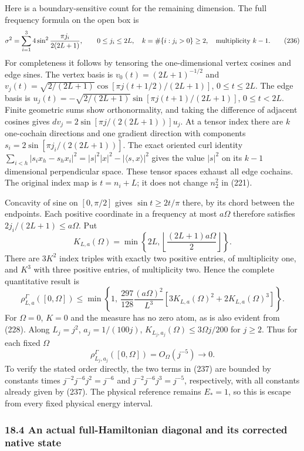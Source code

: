 \documentclass[
  11pt,
]{article}
\begin{document}
Here is a boundary-sensitive count for the remaining dimension. The full
frequency formula on the open box is \[
 \sigma^2=\sum_{i=1}^3
       4\sin^2\frac{\pi j_i}{2(2L+1)},\qquad
 0\le j_i\le2L,\quad k=\#\{i:j_i>0\}\ge2,
 \quad\hbox{multiplicity }k-1.
 \tag{236}
\] For completeness it follows by tensoring the one-dimensional vertex
cosines and edge sines. The vertex basis is \(v_0(t)=(2L+1)^{-1/2}\) and
\(v_j(t)=\sqrt{2/(2L+1)}
\cos[\pi j(t+1/2)/(2L+1)]\), \(0\le t\le2L\). The edge basis is
\(u_j(t)=-\sqrt{2/(2L+1)}
\sin[\pi j(t+1)/(2L+1)]\), \(0\le t<2L\). Finite geometric sums show
orthonormality, and taking the difference of adjacent cosines gives
\(dv_j=2\sin[\pi j/(2(2L+1))]u_j\). At a tensor index there are \(k\)
one-cochain directions and one gradient direction with components
\(s_i=2\sin[\pi j_i/(2(2L+1))]\). The exact oriented curl identity
\(\sum_{i<h}|s_ix_h-s_hx_i|^2
=|s|^2|x|^2-|\langle s,x\rangle|^2\) gives the value \(|s|^2\) on its
\(k-1\) dimensional perpendicular space. These tensor spaces exhaust all
edge cochains. The original index map is \(t=n_i+L\); it does not change
\(n_2^2\) in (221).

Concavity of sine on \([0,\pi/2]\) gives \(\sin t\ge2t/\pi\) there, by
its chord between the endpoints. Each positive coordinate in a frequency
at most \(a\Omega\) therefore satisfies \(2j_i/(2L+1)\le a\Omega\). Put
\[
 K_{L,a}(\Omega)=
 \min\left\{2L,\left\lfloor\frac{(2L+1)a\Omega}{2}\right\rfloor\right\}.
\] There are \(3K^2\) index triples with exactly two positive entries,
of multiplicity one, and \(K^3\) with three positive entries, of
multiplicity two. Hence the complete quantitative result is \[
 \rho_{L,a}^{\Gamma}([0,\Omega])
 \le\min\left\{1,\
     \frac{297}{128}\frac{(a\Omega)^2}{L^3}
       \left[3K_{L,a}(\Omega)^2+2K_{L,a}(\Omega)^3\right]\right\}.
 \tag{237}
\] For \(\Omega=0\), \(K=0\) and the measure has no zero atom, as is
also evident from (228). Along \(L_j=j^2\), \(a_j=1/(100j)\),
\(K_{L_j,a_j}(\Omega)\le3\Omega j/200\) for \(j\ge2\). Thus for each
fixed \(\Omega\) \[
 \rho_{L_j,a_j}^{\Gamma}([0,\Omega])=O_\Omega(j^{-5})
       \longrightarrow0.
 \tag{238}
\] To verify the stated order directly, the two terms in (237) are
bounded by constants times \(j^{-2}j^{-6}j^2=j^{-6}\) and
\(j^{-2}j^{-6}j^3=j^{-5}\), respectively, with all constants already
given by (237). The physical reference remains \(E_*=1\), so this is
escape from every fixed physical energy interval.

\subsubsection{18.4 An actual full-Hamiltonian diagonal and its
corrected native
state}\label{an-actual-full-hamiltonian-diagonal-and-its-corrected-native-state}
\end{document}

